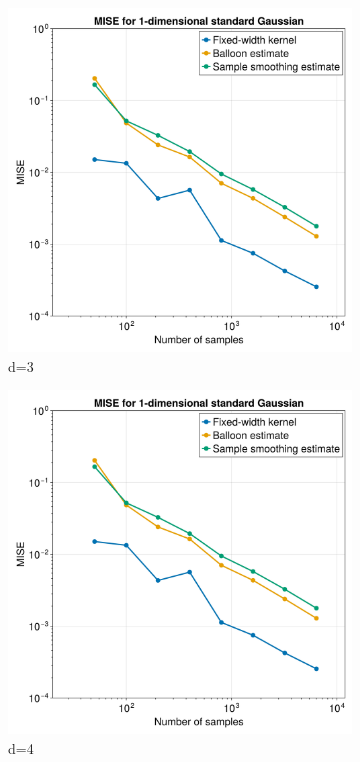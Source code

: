 \documentclass{article}
\begin{document}
\begin{figure}
\begin{subfigure}{.5\textwidth}
  \includegraphics[width=.8\linewidth]{images/MISE_d=1.png}
  \caption{d=3}
  \label{fig:sfig1}
\end{subfigure}%
\begin{subfigure}{.5\textwidth}
  \centering
  \includegraphics[width=.8\linewidth]{images/MISE_d=1.png}
  \caption{d=4}
  \label{fig:sfig2}
\end{subfigure}
\begin{subfigure}{.5\textwidth}
  \centering

\end{subfigure}
\end{figure}
\end{document}
